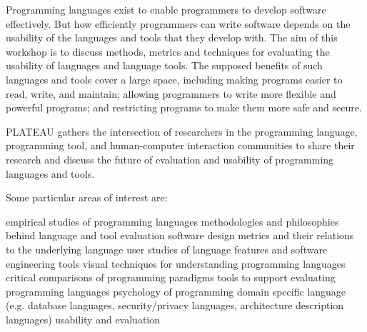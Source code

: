 Programming languages exist to enable programmers to develop software effectively. But how efficiently programmers can write software depends on the usability of the languages and tools that they develop with. The aim of this workshop is to discuss methods, metrics and techniques for evaluating the usability of languages and language tools. The supposed benefits of such languages and tools cover a large space, including making programs easier to read, write, and maintain; allowing programmers to write more flexible and powerful programs; and restricting programs to make them more safe and secure.

PLATEAU gathers the intersection of researchers in the programming language, programming tool, and human-computer interaction communities to share their research and discuss the future of evaluation and usability of programming languages and tools.

Some particular areas of interest are:

empirical studies of programming languages
methodologies and philosophies behind language and tool evaluation
software design metrics and their relations to the underlying language
user studies of language features and software engineering tools
visual techniques for understanding programming languages
critical comparisons of programming paradigms
tools to support evaluating programming languages
psychology of programming
domain specific language (e.g. database languages, security/privacy languages, architecture description languages) usability and evaluation

